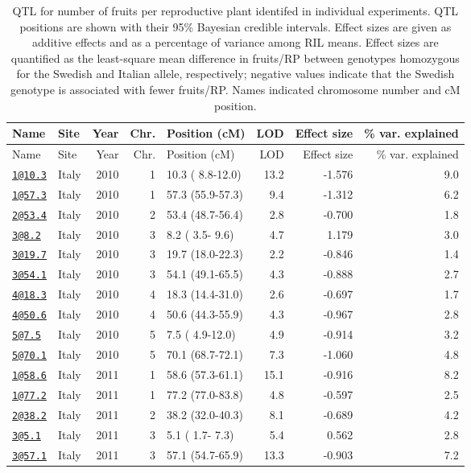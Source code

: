 \documentclass[]{article}
\begin{document}
\begin{longtable}[]{@{}llrrlrrr@{}}
\caption{\label{tab:individual-frut-qtl}QTL for number of fruits per reproductive plant identifed in individual experiments. QTL positions are shown with their 95\% Bayesian credible intervals. Effect sizes are given as additive effects and as a percentage of variance among RIL means. Effect sizes are quantified as the least-square mean difference in fruits/RP between genotypes homozygous for the Swedish and Italian allele, respectively; negative values indicate that the Swedish genotype is associated with fewer fruits/RP. Names indicated chromosome number and cM position.}\tabularnewline
\toprule
Name & Site & Year & Chr. & Position (cM) & LOD & Effect size & \% var. explained\tabularnewline
\midrule
\endfirsthead
\toprule
Name & Site & Year & Chr. & Position (cM) & LOD & Effect size & \% var. explained\tabularnewline
\midrule
\endhead
\href{mailto:1@10.3}{\nolinkurl{1@10.3}} & Italy & 2010 & 1 & 10.3 ( 8.8-12.0) & 13.2 & -1.576 & 9.0\tabularnewline
\href{mailto:1@57.3}{\nolinkurl{1@57.3}} & Italy & 2010 & 1 & 57.3 (55.9-57.3) & 9.4 & -1.312 & 6.2\tabularnewline
\href{mailto:2@53.4}{\nolinkurl{2@53.4}} & Italy & 2010 & 2 & 53.4 (48.7-56.4) & 2.8 & -0.700 & 1.8\tabularnewline
\href{mailto:3@8.2}{\nolinkurl{3@8.2}} & Italy & 2010 & 3 & 8.2 ( 3.5- 9.6) & 4.7 & 1.179 & 3.0\tabularnewline
\href{mailto:3@19.7}{\nolinkurl{3@19.7}} & Italy & 2010 & 3 & 19.7 (18.0-22.3) & 2.2 & -0.846 & 1.4\tabularnewline
\href{mailto:3@54.1}{\nolinkurl{3@54.1}} & Italy & 2010 & 3 & 54.1 (49.1-65.5) & 4.3 & -0.888 & 2.7\tabularnewline
\href{mailto:4@18.3}{\nolinkurl{4@18.3}} & Italy & 2010 & 4 & 18.3 (14.4-31.0) & 2.6 & -0.697 & 1.7\tabularnewline
\href{mailto:4@50.6}{\nolinkurl{4@50.6}} & Italy & 2010 & 4 & 50.6 (44.3-55.9) & 4.3 & -0.967 & 2.8\tabularnewline
\href{mailto:5@7.5}{\nolinkurl{5@7.5}} & Italy & 2010 & 5 & 7.5 ( 4.9-12.0) & 4.9 & -0.914 & 3.2\tabularnewline
\href{mailto:5@70.1}{\nolinkurl{5@70.1}} & Italy & 2010 & 5 & 70.1 (68.7-72.1) & 7.3 & -1.060 & 4.8\tabularnewline
\href{mailto:1@58.6}{\nolinkurl{1@58.6}} & Italy & 2011 & 1 & 58.6 (57.3-61.1) & 15.1 & -0.916 & 8.2\tabularnewline
\href{mailto:1@77.2}{\nolinkurl{1@77.2}} & Italy & 2011 & 1 & 77.2 (77.0-83.8) & 4.8 & -0.597 & 2.5\tabularnewline
\href{mailto:2@38.2}{\nolinkurl{2@38.2}} & Italy & 2011 & 2 & 38.2 (32.0-40.3) & 8.1 & -0.689 & 4.2\tabularnewline
\href{mailto:3@5.1}{\nolinkurl{3@5.1}} & Italy & 2011 & 3 & 5.1 ( 1.7- 7.3) & 5.4 & 0.562 & 2.8\tabularnewline
\href{mailto:3@57.1}{\nolinkurl{3@57.1}} & Italy & 2011 & 3 & 57.1 (54.7-65.9) & 13.3 & -0.903 & 7.2\tabularnewline

\end{longtable}
\end{document}
